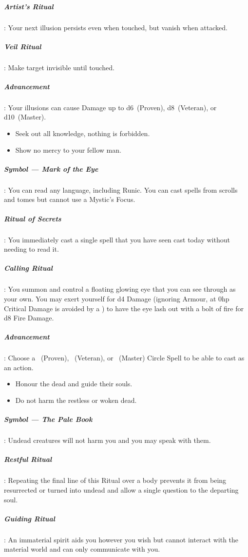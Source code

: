 \documentclass[itdr]{subfiles}
\begin{document}
\subparagraph{Artist's Ritual}: Your next illusion persists even when touched, but vanish when attacked.

\subparagraph{Veil Ritual}: Make target invisible until touched.

\subparagraph{Advancement}: Your illusions can cause Damage up to d6~(Proven), d8~(Veteran), or d10~(Master).

\vfill

{\em\begin{itemize}
		\item Seek out all knowledge, nothing is forbidden.
		\item Show no mercy to your fellow man.
\end{itemize}}

\subparagraph{Symbol --- Mark of the Eye}: You can read any language, including Runic. You can cast spells from scrolls and tomes but cannot use a Mystic's Focus.

\subparagraph{Ritual of Secrets}: You immediately cast a single spell that you have seen cast today without needing to read it.

\subparagraph{Calling Ritual}: You summon and control a floating glowing eye that you can see through as your own. You may exert yourself for d4 Damage (ignoring Armour, at 0hp Critical Damage is avoided by a ) to have the eye lash out with a bolt of fire for d8 Fire Damage.

\subparagraph{Advancement}: Choose a ~(Proven), ~(Veteran), or ~(Master) Circle Spell to be able to cast as an action.

\vfill
\break

{\em\begin{itemize}
		\item Honour the dead and guide their souls.
		\item Do not harm the restless or woken dead.
\end{itemize}}

\subparagraph{Symbol --- The Pale Book}: Undead creatures will not harm you and you may speak with them.

\subparagraph{Restful Ritual}: Repeating the final line of this Ritual over a body prevents it from being resurrected or turned into undead and allow a single question to the departing soul.

\subparagraph{Guiding Ritual}: An immaterial spirit aids you however you wish but cannot interact with the material world and can only communicate with you.
\end{document}
